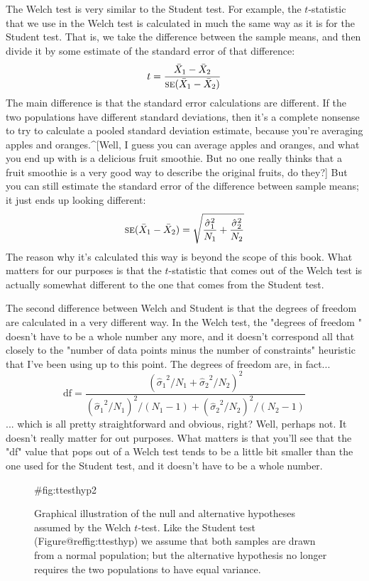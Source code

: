The Welch test is very similar to the Student test. For example, the $t$-statistic that we use in the Welch test is calculated in much the same way as it is for the Student test. That is, we take the difference between the sample means, and then divide it by some estimate of the standard error of that difference:
$$
t = \frac{\bar{X}_1 - \bar{X}_2}{\mbox{\textsc{se}}(\bar{X}_1 - \bar{X}_2)}
$$
The main difference is that the standard error calculations are different. If the two populations have different standard deviations, then it's a complete nonsense to try to calculate a pooled standard deviation estimate, because you're averaging apples and oranges.^[Well, I guess you can average apples and oranges, and what you end up with is a delicious fruit smoothie. But no one really thinks that a fruit smoothie is a very good way to describe the original fruits, do they?] But you can still estimate the standard error of the difference between sample means; it just ends up looking different:
$$
\mbox{\textsc{se}}(\bar{X}_1 - \bar{X}_2) = \sqrt{ \frac{{\hat{\sigma}_1}^2}{N_1} + \frac{{\hat{\sigma}_2}^2}{N_2} }
$$
The reason why it's calculated this way is beyond the scope of this book. What matters for our purposes is that the $t$-statistic that comes out of the Welch test is actually somewhat different to the one that comes from the Student test. 

The second difference between Welch and Student is that the degrees of freedom are calculated in a very different way. In the Welch test, the "degrees of freedom " doesn't have to be a whole number any more, and it doesn't correspond all that closely to the "number of data points minus the number of constraints" heuristic that I've been using up to this point. The degrees of freedom are, in fact...
$$
\mbox{df} = \frac{ ({\hat{\sigma}_1}^2 / N_1 + {\hat{\sigma}_2}^2 / N_2)^2 }{  ({\hat{\sigma}_1}^2 / N_1)^2 / (N_1 -1 )  + ({\hat{\sigma}_2}^2 / N_2)^2 / (N_2 -1 ) } 
$$
... which is all pretty straightforward and obvious, right? Well, perhaps not. It doesn't really matter for out purposes. What matters is that you'll see that the "df" value that pops out of a Welch test tends to be a little bit smaller than the one used for the Student test, and it doesn't have to be a whole number. 


\begin{figure}
\begin{center}
\caption{Graphical illustration of the null and alternative hypotheses assumed by the Welch $t$-test. Like the Student test (Figure@reffig:ttesthyp) we assume that both samples are drawn from a normal population; but the alternative hypothesis no longer requires the two populations to have equal variance.}
\HR
{#fig:ttesthyp2}
\end{center}
\end{figure}




